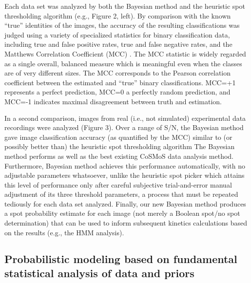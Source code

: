 Each data set was analyzed by both the Bayesian method and the heuristic spot thresholding algorithm (e.g., Figure 2, left). By comparison with the known “true” identities of the images, the accuracy of the resulting classifications was judged using a variety of specialized statistics for binary classification data, including true and false positive rates, true and false negative rates, and the Matthews Correlation Coefficient (MCC) \citep{fawcett_introduction_2006, matthews_comparison_1975}. The MCC statistic is widely regarded as a single overall, balanced measure which is meaningful even when the classes are of very different sizes. The MCC corresponds to the Pearson correlation coefficient between the estimated and “true” binary classifications. MCC=+1 represents a perfect prediction, MCC=0 a perfectly random prediction, and MCC=-1 indicates maximal disagreement between truth and estimation.

In a second comparison, images from real (i.e., not simulated) experimental data recordings were analyzed (Figure 3). Over a range of S/N, the Bayesian method gave image classification accuracy (as quantified by the MCC) similar to (or possibly better than) the heuristic spot thresholding algorithm The Bayesian method performs as well as the best existing CoSMoS data analysis method. Furthermore, Bayesian method achieves this performance automatically, with no adjustable parameters whatsoever, unlike the heuristic spot picker which attains this level of performance only after careful subjective trial-and-error manual adjustment of its three threshold parameters, a process that must be repeated tediously for each data set analyzed. Finally, our new Bayesian method produces a spot probability estimate for each image (not merely a Boolean spot/no spot determination) that can be used to inform subsequent kinetics calculations based on the results (e.g., the HMM analysis).

\subsection{Probabilistic modeling based on fundamental statistical analysis of data and priors}

